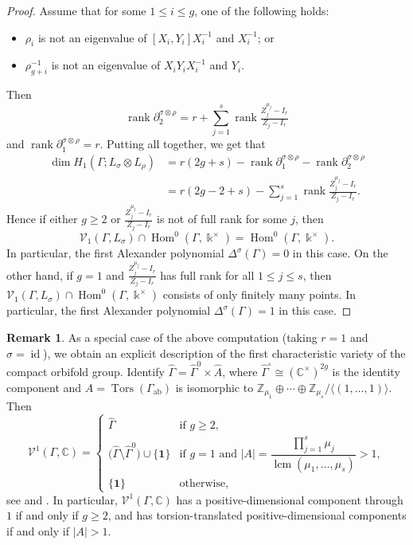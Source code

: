 \documentclass[11pt]{amsart}
\theoremstyle{definition}
\newtheorem{remark}[theorem]{Remark}
\newcommand{\Z}{\mathbb{Z}}
\newcommand{\C}{\mathbb{C}}
\newcommand{\bo}{\mathbf{1}}
\renewcommand{\k}{\Bbbk}
\newcommand{\VV}{\mathcal{V}}
\DeclareMathOperator{\rank}{rank}
\DeclareMathOperator{\id}{id}
\DeclareMathOperator{\ab}{{ab}}
\DeclareMathOperator{\Hom}{{Hom}}
\DeclareMathOperator{\Tors}{Tors}
\DeclareMathOperator{\lcm}{{lcm}}
\newcommand{\abs}[1]{\left| #1 \right|}
\begin{document}
\begin{proof}
Assume that for some $1\leq i\leq g$, one of the following holds:
\begin{itemize}[itemsep=2pt]
\item $\rho_i$ is not an eigenvalue of $[X_i,Y_i]X_i^{-1}$ and $X_i^{-1}$; or 
\item   $\rho_{g+i}^{-1}$ is not an eigenvalue 
of $X_iY_iX_i^{-1}$ and $Y_i$.
\end{itemize}
Then
\[
\rank \partial_2^{\sigma \otimes \rho} = r+ \sum_{j=1}^s 
\rank \tfrac{Z_{j}^{\mu_{j}}-I_r}{ Z_{j}-I_r}
\]
and $\rank \partial_1^{\sigma \otimes \rho} =r$. 
 Putting all together, we get that 
\begin{align*}
    \dim H_1(\Gamma; L_\sigma\otimes L_\rho)& 
    =r(2g+s)-\rank \partial_1^{\sigma \otimes \rho} 
    -\rank \partial_2^{\sigma \otimes \rho}\\
    &=r(2g-2+s)-\sum_{j=1}^s  \rank  \tfrac{Z_{j}^{\mu_{j}}-I_r}{ Z_{j}-I_r}.
\end{align*} 
 Hence if either $g\geq 2 $ or $ \frac{Z_{j}^{\mu_{j}}-I_r}{Z_{j}-I_r}$ is 
 not of full rank for some $j$, then 
 \[
 \VV_1(\Gamma,L_\sigma)\cap \Hom^0(\Gamma,\k^{\times})= 
 \Hom^0(\Gamma,\k^{\times}).
\]
In particular, the first Alexander polynomial $\Delta^\sigma(\Gamma)=0$ in this case.
On the other hand, if $g=1$ and $ \frac{Z_{j}^{\mu_{j}}-I_r}{ Z_{j}-I_r}$ 
has full rank  for all $1\leq j \leq s$, then 
$\VV_1(\Gamma,L_\sigma)\cap \Hom^0(\Gamma,\k^{\times})$ consists 
of only finitely many points. In particular, the first Alexander polynomial 
$\Delta^\sigma(\Gamma)=1$ in this case.
\end{proof}

\begin{remark}
\label{rem:v1-gamma}
As a special case of the above computation (taking $r=1$ 
and $\sigma = \id$), we obtain an explicit description of 
the first characteristic variety of the compact orbifold group. 
Identify $\widehat{\Gamma} = \widehat{\Gamma}^{0} \times \widehat{A}$, 
where $\widehat{\Gamma}^{\circ} \cong (\C^{\times})^{2g}$ 
is the identity component and $A = \Tors(\Gamma_{\ab})$ 
is isomorphic to $\Z_{\mu_1}\oplus \cdots \oplus \Z_{\mu_s}/\langle(1,\dots ,1)\rangle$. 
Then
\begin{equation}
\label{eq:v1piorb}
\VV^1(\Gamma,\C)=\begin{cases}
\widehat{\Gamma} & \text{if $g\geq 2$}, \\[2pt]
\big(\widehat{\Gamma}\setminus\widehat{\Gamma}^{0}\big) \cup \{\bo\} 
& \text{if $g=1$ and $\abs{A}=\dfrac{\prod_{j=1}^s \mu_j}{\lcm(\mu_1,\ldots,\mu_s)} >1$}, \\[2pt]
\{\bo\} & \text{otherwise},
\end{cases}
\end{equation}
see \cite[Prop.~3.11]{ACM} and \cite[\S 9.1]{Su-imrn}.  
In particular, $\VV^1(\Gamma,\C)$ has a positive-dimensional 
component through $1$ if and only if $g \geq 2$, and has 
torsion-translated positive-dimensional components if and 
only if $\abs{A} > 1$. 
\end{remark}
\end{document}
